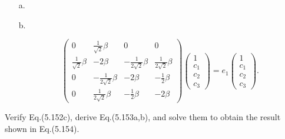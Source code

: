 \documentclass[a4paper]{book}
\newcounter{exercise}[chapter]
\newcounter{solution}[chapter]
\begin{document}
	\begin{solution}
	
	\begin{itemize}
	
	\item[a.]
	
	\item[b.] 
	
	\[
		\begin{pmatrix}
			0 & \frac{1}{\sqrt{2}} \beta & 0 & 0 \\
		\frac{1}{\sqrt{2}} \beta & -2\beta & -\frac{1}{2\sqrt{2}} \beta & \frac{1}{2\sqrt{2}} \beta \\
			0 & -\frac{1}{2\sqrt{2}} \beta & -2\beta & -\frac{1}{2} \beta \\
			0 & \frac{1}{2\sqrt{2}} \beta & -\frac{1}{2} \beta & -2\beta 
		\end{pmatrix} \begin{pmatrix}
			1 \\ c_1 \\ c_2 \\ c_3
		\end{pmatrix} = e_1 \begin{pmatrix}
			1 \\ c_1 \\ c_2 \\ c_3
		\end{pmatrix} .
	\]
	
	\end{itemize}		
	
	\end{solution}
	
	\begin{exercise}
	Verify Eq.(5.152c), derive Eq.(5.153a,b), and solve them to obtain the result shown in Eq.(5.154).
	\end{exercise}
	
\end{document}
